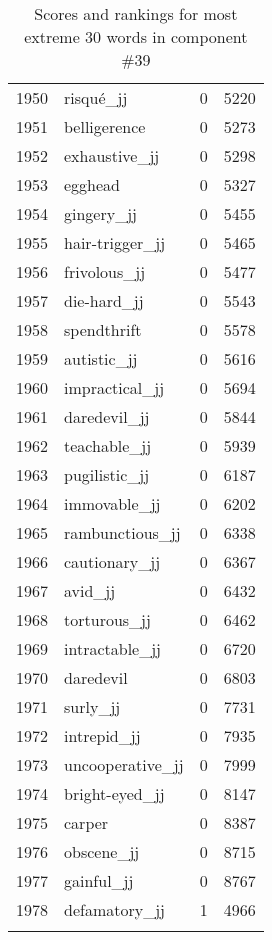 \begin{longtable}[!htbp]{| rlr@{.}l |}
    1950 & risqué\_jj & 0 & 5220 \\
    1951 & belligerence & 0 & 5273 \\
    1952 & exhaustive\_jj & 0 & 5298 \\
    1953 & egghead & 0 & 5327 \\
    1954 & gingery\_jj & 0 & 5455 \\
    1955 & hair-trigger\_jj & 0 & 5465 \\
    1956 & frivolous\_jj & 0 & 5477 \\
    1957 & die-hard\_jj & 0 & 5543 \\
    1958 & spendthrift & 0 & 5578 \\
    1959 & autistic\_jj & 0 & 5616 \\
    1960 & impractical\_jj & 0 & 5694 \\
    1961 & daredevil\_jj & 0 & 5844 \\
    1962 & teachable\_jj & 0 & 5939 \\
    1963 & pugilistic\_jj & 0 & 6187 \\
    1964 & immovable\_jj & 0 & 6202 \\
    1965 & rambunctious\_jj & 0 & 6338 \\
    1966 & cautionary\_jj & 0 & 6367 \\
    1967 & avid\_jj & 0 & 6432 \\
    1968 & torturous\_jj & 0 & 6462 \\
    1969 & intractable\_jj & 0 & 6720 \\
    1970 & daredevil & 0 & 6803 \\
    1971 & surly\_jj & 0 & 7731 \\
    1972 & intrepid\_jj & 0 & 7935 \\
    1973 & uncooperative\_jj & 0 & 7999 \\
    1974 & bright-eyed\_jj & 0 & 8147 \\
    1975 & carper & 0 & 8387 \\
    1976 & obscene\_jj & 0 & 8715 \\
    1977 & gainful\_jj & 0 & 8767 \\
    1978 & defamatory\_jj & 1 & 4966 \\
    \hline
    \caption{Scores and rankings for most extreme 30 words in component \#39} \\
\end{longtable}
